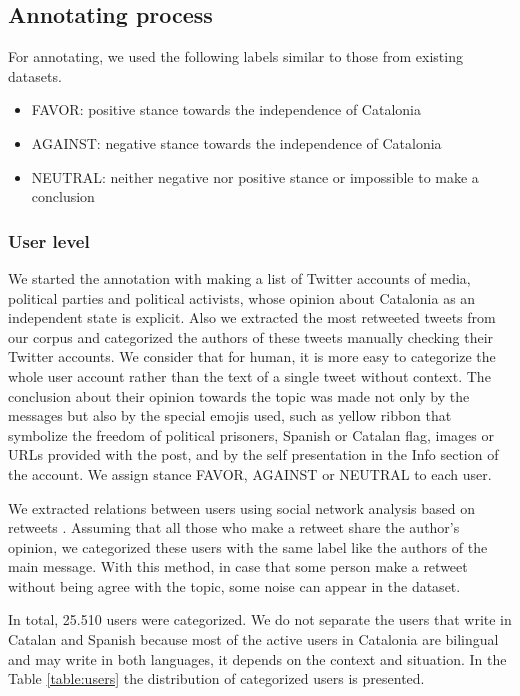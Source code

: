 \documentclass[10pt, a4paper]{article}
\begin{document}
\subsection{Annotating process}

For annotating, we used the following labels similar to  those from existing datasets. 
\begin{itemize}
\item FAVOR: positive stance towards the independence of Catalonia 
\item AGAINST: negative stance towards the independence of Catalonia 
\item NEUTRAL: neither negative nor positive stance or impossible to make a conclusion 
\end{itemize}

\subsubsection{User level}

We started the annotation with making a list of Twitter accounts of media, political parties and political activists, whose opinion about Catalonia as an independent state is explicit. Also we extracted the most retweeted tweets from our corpus and categorized the authors of these tweets manually checking their Twitter accounts. We consider that for human, it is more easy to categorize the whole user account rather than the text of a single tweet without context. The conclusion about their opinion towards the topic was made not only by the messages but also  by  the special emojis used, such as yellow ribbon that symbolize the freedom of political prisoners, Spanish or Catalan flag, images or URLs provided  with the post, and by the self presentation in the Info section of the account. We assign stance FAVOR, AGAINST or NEUTRAL to each user.  

We extracted relations between users using social network analysis based on retweets \cite{SNA2002}. Assuming that all those who make a retweet share the author's opinion, we categorized these users with the same label like the authors of the main message. With this method, in case that some person make a retweet without being agree with the topic, some noise can appear in the dataset.  

In total, 25.510 users were categorized. We do not separate the users that write in Catalan and Spanish because most of the  active users in Catalonia are bilingual and may write in both languages, it depends on the context and situation. In the Table \ref{table:users} the distribution of categorized users is presented. 
\end{document}
